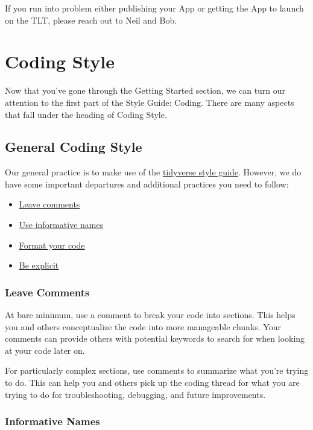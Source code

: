 \documentclass[
]{book}
\providecommand{\tightlist}{%
  \setlength{\itemsep}{0pt}\setlength{\parskip}{0pt}}
\begin{document}
If you run into problem either publishing your App or getting the App to launch on the TLT, please reach out to Neil and Bob.

\hypertarget{coding}{%
\chapter{Coding Style}\label{coding}}

Now that you've gone through the Getting Started section, we can turn our attention to the first part of the Style Guide: Coding. There are many aspects that fall under the heading of Coding Style.

\hypertarget{genCode}{%
\section{General Coding Style}\label{genCode}}

Our general practice is to make use of the \href{https://style.tidyverse.org/}{tidyverse style guide}. However, we do have some important departures and additional practices you need to follow:

\begin{itemize}
\tightlist
\item
  \protect\hyperlink{comments}{Leave comments}
\item
  \protect\hyperlink{naming}{Use informative names}
\item
  \protect\hyperlink{formatCode}{Format your code}
\item
  \protect\hyperlink{explicit}{Be explicit}
\end{itemize}

\hypertarget{comments}{%
\subsection{Leave Comments}\label{comments}}

At bare minimum, use a comment to break your code into sections. This helps you and others conceptualize the code into more manageable chunks. Your comments can provide others with potential keywords to search for when looking at your code later on.

For particularly complex sections, use comments to summarize what you're trying to do. This can help you and others pick up the coding thread for what you are trying to do for troubleshooting, debugging, and future improvements.

\hypertarget{naming}{%
\subsection{Informative Names}\label{naming}}
\end{document}
